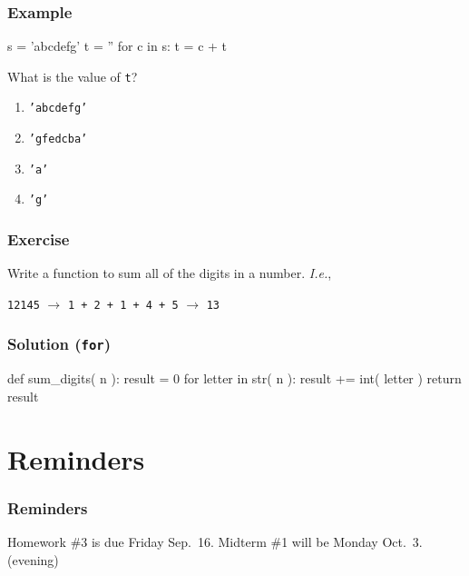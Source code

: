 \documentclass[11pt]{beamer}
\begin{document}
\begin{frame}[fragile]
  \frametitle{Example}
  \Enlarge

  \begin{semiverbatim}
s = 'abcdefg'
t = ''
for c in s:
    t = c + t
  \end{semiverbatim}
  What is the value of \texttt{t}?
  \begin{enumerate}[label=\Alph*]
  \item  \texttt{'abcdefg'}
  \item  \texttt{'gfedcba'}
  \item  \texttt{'a'}
  \item  \texttt{'g'}
  \end{enumerate}
\end{frame}

\begin{frame}[fragile]
  \frametitle{Exercise}
  \Enlarge

  Write a function to sum all of the digits in a number.  \emph{I.e.},

  \begin{center}
  \texttt{12145} $\rightarrow$ \texttt{1 + 2 + 1 + 4 + 5} $\rightarrow$ \texttt{13}
  \end{center}
\end{frame}

\begin{frame}[fragile]
  \frametitle{Solution (\texttt{for})}
  \Enlarge

  \begin{semiverbatim}
def sum_digits( n ):
    result = 0
    for letter in str( n ):
        result += int( letter )
    return result
  \end{semiverbatim}
\end{frame}

\section{Reminders}

\begin{frame}
  \frametitle{Reminders}
  \Enlarge

  \begin{itemize}
  \myitem  Homework \#3 is due Friday Sep.\ 16.
  \myitem  Midterm \#1 will be Monday Oct.\ 3.  (evening)
  \end{itemize}
\end{frame}
\end{document}
